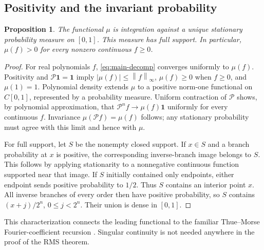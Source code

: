 \documentclass[11pt,a4paper]{article}
\newtheorem{proposition}[theorem]{Proposition}
\theoremstyle{definition}
\theoremstyle{remark}
\newcommand{\one}{\mathbf 1}
\newcommand{\Pop}{\mathcal P}
\newcommand{\norm}[1]{\left\|#1\right\|}
\numberwithin{equation}{section}
\begin{document}
\subsection{Positivity and the invariant probability}
\begin{proposition}
\label{prop:mu}
The functional $\mu$ is integration against a unique stationary probability
measure on $[0,1]$. This measure has full support. In particular,
$\mu(f)>0$ for every nonzero continuous $f\ge0$.
\end{proposition}
\begin{proof}
For real polynomials $f$, \cref{eq:main-decomp} converges uniformly to
$\mu(f)$. Positivity and $\Pop\one=\one$ imply
$|\mu(f)|\le\norm f_\infty$, $\mu(f)\ge0$ when $f\ge0$, and $\mu(1)=1$.
Polynomial density extends $\mu$ to a positive norm-one functional on
$C[0,1]$, represented by a probability measure. Uniform contraction of
$\Pop$ shows, by polynomial approximation, that
$\Pop^nf\to\mu(f)\one$ uniformly for every continuous $f$. Invariance
$\mu(\Pop f)=\mu(f)$ follows; any stationary probability must agree with
this limit and hence with $\mu$.

For full support, let $S$ be the nonempty closed support. If $x\in S$ and a
branch probability at $x$ is positive, the corresponding inverse-branch
image belongs to $S$. This follows by applying stationarity to a nonnegative
continuous function supported near that image. If $S$ initially contained
only endpoints, either endpoint sends positive probability to $1/2$.
Thus $S$ contains an interior point $x$. All inverse branches of every order
then have positive probability, so $S$ contains
$(x+j)/2^n$, $0\le j<2^n$. Their union is dense in $[0,1]$.
\end{proof}

This characterization connects the leading functional to the familiar
Thue--Morse Fourier-coefficient recursion \cite{baake}. Singular continuity
is not needed anywhere in the proof of the RMS theorem.
\end{document}
